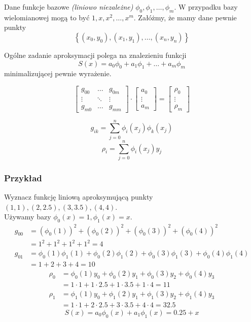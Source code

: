 \documentclass[../mn-notatki.tex]{subfiles}
\begin{document}
\pagebreak

Dane funkcje bazowe \textit{(liniowo niezależne)}
$\phi_0, \phi_1, \ldots, \phi_m$. W przypadku bazy wielomianowej mogą to być
$1, x, x^2, \ldots, x^m$. Załóżmy, że mamy dane pewnie punkty
\[
\left\{ (x_0, y_0), (x_1, y_1), \ldots, (x_n, y_n) \right\}
\]

Ogólne zadanie aproksymacji polega na znalezieniu funkcji
\[
S(x) = a_0 \phi_0 + a_1 \phi_1 + \ldots + a_m \phi_m
\]
minimalizującej pewnie wyrażenie.

\begin{tcolorbox}
\[
\begin{bmatrix}
g_{00} & \ldots & g_{0m}\\
\vdots & \ddots & \vdots\\
g_{m0} & \ldots & g_{mm}
\end{bmatrix}
\cdot
\begin{bmatrix}
a_0\\
\vdots \\
a_m
\end{bmatrix}
=
\begin{bmatrix}
\rho_0\\
\vdots \\
\rho_m
\end{bmatrix}
\]

\[
g_{ik} = \sum_{j=0}^n \phi_i(x_j)\phi_k(x_j)
\]
\[
\rho_i = \sum_{j=0}^{n} \phi_i (x_j) y_j
\]
\end{tcolorbox}

\subsubsection{Przykład}
Wyznacz funkcję liniową aproksymującą punkty $(1,1), (2, 2.5), (3, 3.5), (4,4)$.\\
Używamy bazy $\phi_0(x) = 1, \phi_1(x) = x$.
\begin{align*}
g_{00} &=  \left(  \phi_0(1) \right)^2 + \left(  \phi_0(2) \right)^2
+ \left(  \phi_0(3) \right)^2 + \left(  \phi_0(4) \right)^2\\
&= 1^2 + 1^2 + 1^2 + 1^2 = 4 \\
g_{01} &= \phi_0(1)\phi_1(1) + \phi_0(2)\phi_1(2)
+ \phi_0(3)\phi_1(3) + \phi_0(4)\phi_1(4)\\ &= 1 + 2 +3 +4 = 10%
\end{align*}
\begin{align*}
\rho_{0} &=  \phi_0(1)y_0 + \phi_0(2)y_1 + \phi_0(3)y_2 + \phi_0(4)y_3\\
&= 1 \cdot 1 + 1 \cdot 2.5 + 1 \cdot 3.5 + 1 \cdot 4 = 11 \\
\rho_{1} &=  \phi_1(1)y_0 + \phi_1(2)y_1 + \phi_1(3)y_2 + \phi_1(4)y_3\\
&= 1 \cdot 1 + 2 \cdot 2.5 + 3 \cdot 3.5 + 4 \cdot 4 = 32.5
\end{align*}
\[
S(x) = a_0\phi_0(x) + a_1\phi_1(x) = 0.25 + x
\]
\end{document}
